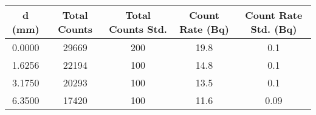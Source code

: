 \begin{tabular}{ccccc}
\toprule
 d (mm) &  Total Counts &  Total Counts Std. &  Count Rate (Bq) &  Count Rate Std. (Bq) \\
\midrule
 0.0000 &       29669 &         200 &        19.8 &              0.1 \\
 1.6256 &       22194 &         100 &        14.8 &              0.1 \\
 3.1750 &       20293 &         100 &        13.5 &              0.1 \\
 6.3500 &       17420 &         100 &        11.6 &              0.09 \\
\bottomrule
\end{tabular}
